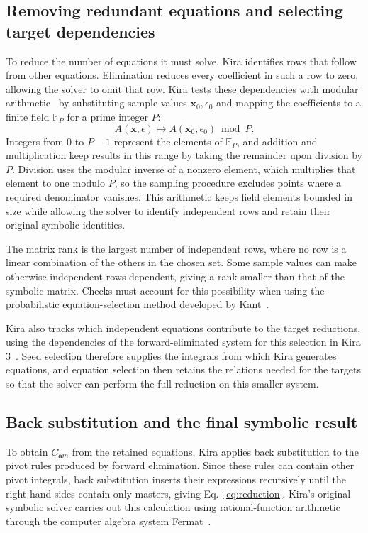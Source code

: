 \subsection{Removing redundant equations and selecting target dependencies}
To reduce the number of equations it must solve, Kira identifies rows
that follow from other equations. Elimination reduces every coefficient
in such a row to zero, allowing the solver to omit that row. Kira
tests these dependencies with modular arithmetic~\cite{KiraOriginal}
by substituting sample values $\boldsymbol x_0,\epsilon_0$ and mapping
the coefficients to a finite field $\mathbb F_P$ for a prime integer $P$:
\begin{equation}
 A(\boldsymbol x,\epsilon)
 \longmapsto A(\boldsymbol x_0,\epsilon_0)\bmod P.
 \label{eq:modular-selection}
\end{equation}
Integers from $0$ to $P-1$ represent the elements of $\mathbb F_P$, and
addition and multiplication keep results in this range by taking the
remainder upon division by $P$. Division uses the modular inverse of a
nonzero element, which multiplies that element to one modulo $P$, so the
sampling procedure excludes points where a required denominator vanishes.
This arithmetic keeps field elements bounded in size while allowing the
solver to identify independent rows and retain their original symbolic
identities.

The matrix rank is the largest number of independent rows, where no row
is a linear combination of the others in the chosen set. Some sample
values can make otherwise independent rows dependent, giving a rank
smaller than that of the symbolic matrix. Checks must account for this
possibility when using the probabilistic equation-selection method
developed by Kant~\cite{Kant}.

Kira also tracks which independent equations contribute to the target
reductions, using the dependencies of the forward-eliminated system for
this selection in Kira 3~\cite{Kira3}. Seed selection therefore supplies
the integrals from which Kira generates equations, and equation selection
then retains the relations needed for the targets so that the solver can
perform the full reduction on this smaller system.

\subsection{Back substitution and the final symbolic result}
To obtain $C_{\boldsymbol a m}$ from the retained equations, Kira applies
back substitution to the pivot rules produced by forward elimination.
Since these rules can contain other pivot integrals, back substitution
inserts their expressions recursively until the right-hand sides contain
only masters, giving Eq.~\eqref{eq:reduction}. Kira's original symbolic
solver carries out this calculation using rational-function arithmetic
through the computer algebra system Fermat~\cite{KiraOriginal}.


